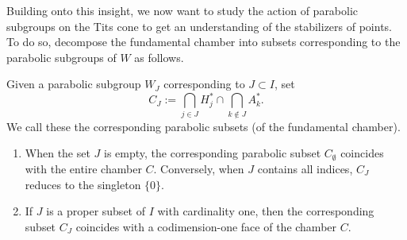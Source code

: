 Building onto this insight, we now want to study the action of parabolic subgroups on the Tits cone to get an understanding of the stabilizers of points.
To do so, decompose the fundamental chamber into subsets corresponding to the parabolic subgroups of \(W\) as follows.

\begin{definition}
    Given a parabolic subgroup \(W_J\) corresponding to \(J\subset I\), set
    \[C_J := \bigcap_{j\in J} H_j^* \cap \bigcap_{k\notin J} A_k^*.\]
    We call these the corresponding parabolic subsets (of the fundamental chamber).
\end{definition}

\begin{example}\label{ex:parabolicset} %
    \begin{enumerate}
        \item When the set \(J\) is empty, the corresponding parabolic subset \(C_\emptyset\) coincides with the entire chamber \(C\).
              Conversely, when \(J\) contains all indices, \(C_J\) reduces to the singleton \(\{0\}\).
        \item If \(J\) is a proper subset of \(I\) with cardinality one, then the corresponding subset \(C_J\) coincides with a codimension-one face of the chamber \(C\).
    \end{enumerate}
\end{example}

